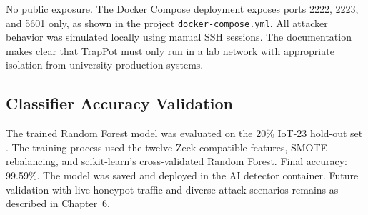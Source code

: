 No public exposure. The Docker Compose deployment exposes ports 2222, 2223, and 5601 only, as shown in the project \texttt{docker-compose.yml}. All attacker behavior was simulated locally using manual SSH sessions. The documentation makes clear that TrapPot must only run in a lab network with appropriate isolation from university production systems.

\subsection{Classifier Accuracy Validation}
\label{subsec:classifier_validation}

The trained Random Forest model was evaluated on the 20\% IoT-23 hold-out set \cite{iot23dataset}. The training process used the twelve Zeek-compatible features, SMOTE rebalancing, and scikit-learn's cross-validated Random Forest. Final accuracy: 99.59\%. The model was saved and deployed in the AI detector container. Future validation with live honeypot traffic and diverse attack scenarios remains as described in Chapter~6.
